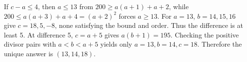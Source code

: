 If $c-a\le4$, then $a\le13$ from $200\ge a(a+1)+a+2$, while $200\le a(a+3)+a+4=(a+2)^2$ forces $a\ge13$. For $a=13$, $b=14,15,16$ give $c=18,5,-8$, none satisfying the bound and order. Thus the difference is at least 5. At difference 5, $c=a+5$ gives $a(b+1)=195$. Checking the positive divisor pairs with $a<b<a+5$ yields only $a=13,b=14,c=18$. Therefore the unique answer is $\boxed{(13,14,18)}$.
